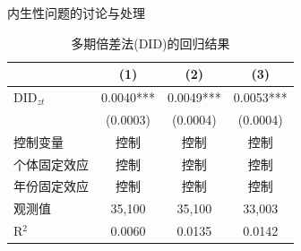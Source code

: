 \documentclass{beamer}
\begin{document}
\begin{frame}{内生性问题的讨论与处理}
    \begin{table}
        \centering
        \caption{多期倍差法(DID)的回归结果}
        \label{tab:DID_results}
        \begin{tabular}{lccc}
            \toprule
            & (1) & (2) & (3) \\
            \midrule
            DID$_{zt}$ & 0.0040*** & 0.0049*** & 0.0053*** \\
                       & (0.0003)  & (0.0004)  & (0.0004)  \\
            控制变量   & 控制      & 控制      & 控制      \\
            个体固定效应 & 控制      & 控制      & 控制      \\
            年份固定效应 & 控制      & 控制      & 控制      \\
            观测值     & 35,100    & 35,100    & 33,003    \\
            R$^{2}$    & 0.0060    & 0.0135    & 0.0142    \\
            \bottomrule
        \end{tabular}
    \end{table}
\end{frame}
\end{document}
